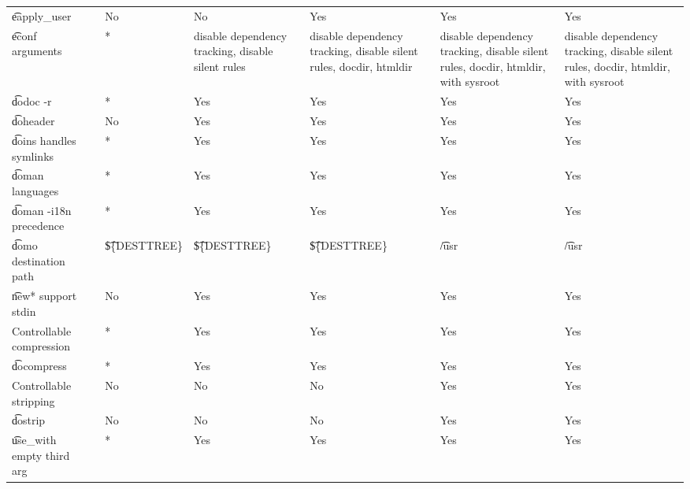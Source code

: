 \begin{landscape}
\begin{longtable}{llP{7.5em}P{7.5em}P{7.5em}P{7.5em}P{7.5em}}
\t{eapply_user} &  &
    No & No & Yes & Yes & Yes \\

\t{econf} arguments &  &
    * &
    disable dependency tracking, disable silent rules &
    disable dependency tracking, disable silent rules, docdir, htmldir &
    disable dependency tracking, disable silent rules, docdir, htmldir, with sysroot &
    disable dependency tracking, disable silent rules, docdir, htmldir, with sysroot \\

\t{dodoc -r} &  &
    * & Yes & Yes & Yes & Yes \\

\t{doheader} &  &
    No & Yes & Yes & Yes & Yes \\

\t{doins} handles symlinks &  &
    * & Yes & Yes & Yes & Yes \\

\t{doman} languages &  &
    * & Yes & Yes & Yes & Yes \\

\t{doman -i18n} precedence &  &
    * & Yes & Yes & Yes & Yes \\

\t{domo} destination path &  &
    \t{\$\{DESTTREE\}} & \t{\$\{DESTTREE\}} & \t{\$\{DESTTREE\}} & \t{/usr} & \t{/usr} \\

\t{new*} support stdin &  &
    No & Yes & Yes & Yes & Yes \\

Controllable compression &  &
    * & Yes & Yes & Yes & Yes \\

\t{docompress} &  &
    * & Yes & Yes & Yes & Yes \\

Controllable stripping &  &
    No & No & No & Yes & Yes \\

\t{dostrip} &  &
    No & No & No & Yes & Yes \\

\t{use_with} empty third arg &  &
    * & Yes & Yes & Yes & Yes \\


\end{longtable}
\end{landscape}
